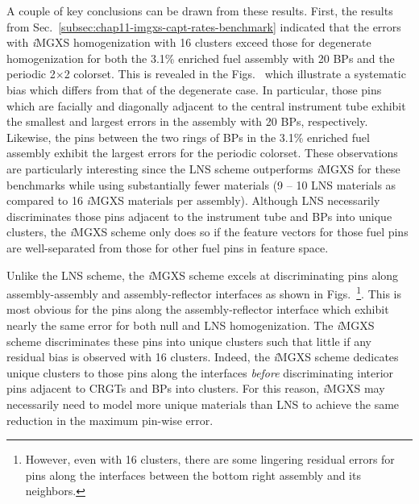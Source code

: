 A couple of key conclusions can be drawn from these results. First, the results from Sec.~\ref{subsec:chap11-imgxs-capt-rates-benchmark} indicated that the errors with \textit{i}\ac{MGXS} homogenization with 16 clusters exceed those for degenerate homogenization for both the 3.1\% enriched fuel assembly with 20 \acp{BP} and the periodic 2$\times$2 colorset. This is revealed in the Figs.~ which illustrate a systematic bias which differs from that of the degenerate case. In particular, those pins which are facially and diagonally adjacent to the central instrument tube exhibit the smallest and largest errors in the assembly with 20 \acp{BP}, respectively. Likewise, the pins between the two rings of \acp{BP} in the 3.1\% enriched fuel assembly exhibit the largest errors for the periodic colorset. These observations are particularly interesting since the \ac{LNS} scheme outperforms \textit{i}\ac{MGXS} for these benchmarks while using substantially fewer materials (9 -- 10 \ac{LNS} materials as compared to 16 \textit{i}\ac{MGXS} materials per assembly). Although \ac{LNS} necessarily discriminates those pins adjacent to the instrument tube and \acp{BP} into unique clusters, the \textit{i}\ac{MGXS} scheme only does so if the feature vectors for those fuel pins are well-separated from those for other fuel pins in feature space.

Unlike the \ac{LNS} scheme, the \textit{i}\ac{MGXS} scheme excels at discriminating pins along assembly-assembly and assembly-reflector interfaces as shown in Figs.~\footnote{However, even with 16 clusters, there are some lingering residual errors for pins along the interfaces between the bottom right assembly and its neighbors.}. This is most obvious for the pins along the assembly-reflector interface which exhibit nearly the same error for both null and \ac{LNS} homogenization. The \textit{i}\ac{MGXS} scheme discriminates these pins into unique clusters such that little if any residual bias is observed with 16 clusters. Indeed, the \textit{i}\ac{MGXS} scheme dedicates unique clusters to those pins along the interfaces \textit{before} discriminating interior pins adjacent to \acp{CRGT} and \acp{BP} into clusters. For this reason, \textit{i}\ac{MGXS} may necessarily need to model more unique materials than \ac{LNS} to achieve the same reduction in the maximum pin-wise error.

